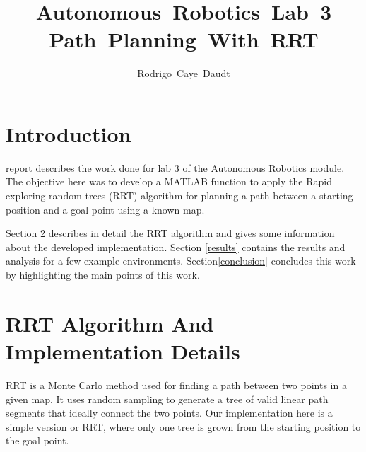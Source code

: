 \documentclass[journal]{IEEEtran}
\begin{document}
\title{Autonomous~Robotics~Lab~3 \\ Path~Planning~With~RRT}
%

\author{Rodrigo~Caye~Daudt}





\maketitle



\section{Introduction}

 report describes the work done for lab 3 of the Autonomous Robotics module. The objective here was to develop a MATLAB function to apply the Rapid exploring random trees (RRT) algorithm for planning a path between a starting position and a goal point using a known map.

Section \ref{rrt} describes in detail the RRT algorithm and gives some information about the developed implementation. Section \ref{results} contains the results and analysis for a few example environments. Section\ref{conclusion} concludes this work by highlighting the main points of this work.

\section{RRT Algorithm And Implementation Details}\label{rrt}

RRT is a Monte Carlo method used for finding a path between two points in a given map. It uses random sampling to generate a tree of valid linear path segments that ideally connect the two points. Our implementation here is a simple version or RRT, where only one tree is grown from the starting position to the goal point.
\end{document}
